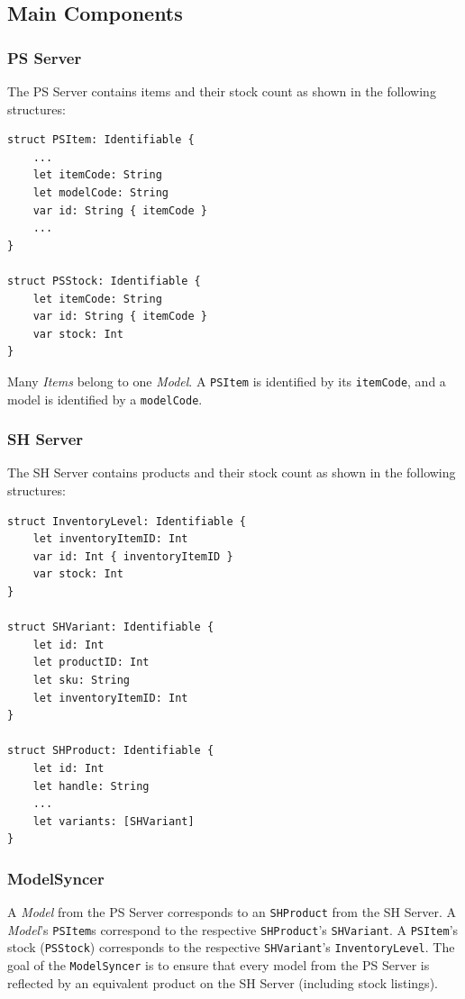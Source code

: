 \subsection{Main Components}

\subsubsection{PS Server}
The PS Server contains items and their stock count as shown in the following structures:

\begin{verbatim}
struct PSItem: Identifiable {
    ...
    let itemCode: String
    let modelCode: String
    var id: String { itemCode }
    ...
}

struct PSStock: Identifiable {
    let itemCode: String
    var id: String { itemCode }
    var stock: Int
}
\end{verbatim}

Many \textit{Items} belong to one \textit{Model}. A \texttt{PSItem} is identified by its \texttt{itemCode}, and a model is identified by a \texttt{modelCode}.

\subsubsection{SH Server}
The SH Server contains products and their stock count as shown in the following structures:

\begin{verbatim}
struct InventoryLevel: Identifiable {
    let inventoryItemID: Int
    var id: Int { inventoryItemID }
    var stock: Int
}

struct SHVariant: Identifiable {
    let id: Int
    let productID: Int
    let sku: String
    let inventoryItemID: Int
}

struct SHProduct: Identifiable {
    let id: Int
    let handle: String
    ...
    let variants: [SHVariant]
}
\end{verbatim}

\subsubsection{ModelSyncer}
A \textit{Model} from the PS Server corresponds to an \texttt{SHProduct} from the SH Server. A \textit{Model}'s \texttt{PSItem}s correspond to the respective \texttt{SHProduct}'s \texttt{SHVariant}. A \texttt{PSItem}'s stock (\texttt{PSStock}) corresponds to the respective \texttt{SHVariant}'s \texttt{InventoryLevel}. The goal of the \texttt{ModelSyncer} is to ensure that every model from the PS Server is reflected by an equivalent product on the SH Server (including stock listings).

